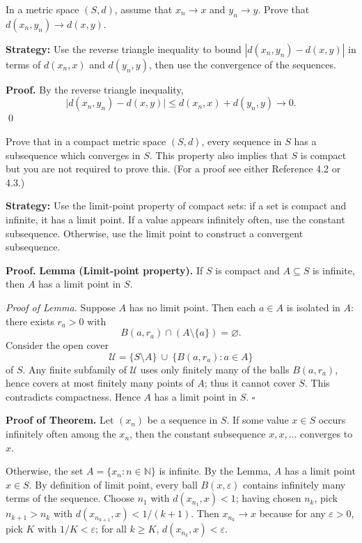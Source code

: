 \begin{problembox}
In a metric space $(S, d)$, assume that $x_n \to x$ and $y_n \to y$. Prove that $d(x_n, y_n) \to d(x, y)$.
\end{problembox}

\noindent\textbf{Strategy:} Use the reverse triangle inequality to bound $|d(x_n, y_n) - d(x, y)|$ in terms of $d(x_n, x)$ and $d(y_n, y)$, then use the convergence of the sequences.

\noindent\textbf{Proof.}
By the reverse triangle inequality,
\[
\big|d(x_n,y_n)-d(x,y)\big|\le d(x_n,x)+d(y_n,y)\to 0.
\]\qed
\medskip



\begin{problembox}
Prove that in a compact metric space $(S, d)$, every sequence in $S$ has a subsequence which converges in $S$. This property also implies that $S$ is compact but you are not required to prove this. (For a proof see either Reference 4.2 or 4.3.)
\end{problembox}

\noindent\textbf{Strategy:} Use the limit-point property of compact sets: if a set is compact and infinite, it has a limit point. If a value appears infinitely often, use the constant subsequence. Otherwise, use the limit point to construct a convergent subsequence.

\noindent\textbf{Proof.}
\textbf{Lemma (Limit-point property).}
If \(S\) is compact and \(A\subseteq S\) is infinite, then \(A\) has a limit point in \(S\).

\emph{Proof of Lemma.}
Suppose \(A\) has no limit point. Then each \(a\in A\) is isolated in \(A\): there exists \(r_a>0\) with
\[
B(a,r_a)\cap (A\setminus\{a\})=\varnothing.
\]
Consider the open cover
\[
\mathcal{U}=\{S\setminus A\}\ \cup\ \{B(a,r_a):a\in A\}
\]
of \(S\). Any finite subfamily of \(\mathcal{U}\) uses only finitely many of the balls \(B(a,r_a)\), hence covers at most finitely many points of \(A\); thus it cannot cover \(S\). This contradicts compactness. Hence \(A\) has a limit point in \(S\). \(\square\)

\textbf{Proof of Theorem.}
Let \((x_n)\) be a sequence in \(S\).
If some value \(x\in S\) occurs infinitely often among the \(x_n\), then the constant subsequence \(x,x,\dots\) converges to \(x\).

Otherwise, the set \(A=\{x_n:n\in\mathbb{N}\}\) is infinite. By the Lemma, \(A\) has a limit point \(x\in S\). By definition of limit point, every ball \(B(x,\varepsilon)\) contains infinitely many terms of the sequence. Choose \(n_1\) with \(d(x_{n_1},x)<1\); having chosen \(n_k\), pick \(n_{k+1}>n_k\) with \(d(x_{n_{k+1}},x)<1/(k+1)\). Then \(x_{n_k}\to x\) because for any \(\varepsilon>0\), pick \(K\) with \(1/K<\varepsilon\); for all \(k\ge K\), \(d(x_{n_k},x)<\varepsilon\).

